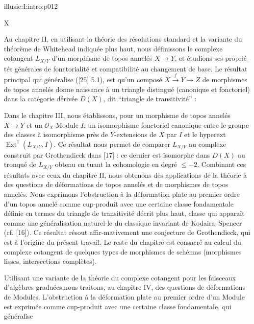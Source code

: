 \IllusieSetPhysicalPageSize{447bp}{698.6bp}
\begin{illusiefrontpage}{illusie:I:intro:p012}{}
\begin{center}\fontsize{10}{12}\selectfont X\end{center}
\vspace{12bp}
\hypertarget{illusie:I:intro:p012:p1}{}%
Au chapitre II, en utilisant la théorie des résolutions standard et la variante du
théorème de Whitehead indiquée plus haut, nous définissons le complexe cotangent
$L_{X/Y}$ d'un morphisme de topos annelés $X\longrightarrow Y$, et étudions ses
proprié-\linebreak tés générales de fonctorialité et compatibilité au changement de
base. Le résultat principal qui généralise ([25] 5.1), est qu'un composé
$X\xrightarrow{f}Y\longrightarrow Z$ de morphismes de topos annelés donne naissance
à un triangle distingué (canonique et fonctoriel) dans la catégorie dérivée $D(X)$,
dit ``triangle de transitivité'' :

\hypertarget{illusie:I:intro:p012:d1}{}%
\IllusieTransitivityTriangle

\vspace{1bp}
\hypertarget{illusie:I:intro:p012:p2}{}%
Dans le chapitre III, nous établissons, pour un morphisme de topos annelés
$X\longrightarrow Y$ et un $\mathcal O_X$-Module $I$, un isomorphisme fonctoriel
canonique entre le groupe des classes à isomorphisme près de $Y$-extensions de $X$
par $I$ et le hyperext $\operatorname{Ext}^{1}(L_{X/Y},I)$. Ce résultat nous permet
de comparer $L_{X/Y}$ au complexe construit par Grothendieck dans [17] : ce dernier
est isomorphe dans $D(X)$ au tronqué de $L_{X/Y}$ obtenu en tuant la cohomologie en
degré $\leq -2$. Combinant ces résultats avec ceux du chapitre II, nous obtenons des
applications de la théorie à des questions de déformations de topos annelés et de
morphismes de topos annelés. Nous exprimons l'obstruction à la déformation plate au
premier ordre d'un topos annelé comme cup-produit avec une certaine classe
fondamentale définie en termes du triangle de transitivité décrit plus haut, classe
qui apparaît comme une généralisation naturel-\linebreak le du classique invariant
de Kodaira--Spencer (cf. [16]). Ce résultat résout affir-\linebreak mativement une
conjecture de Grothendieck, qui est à l'origine du présent travail. Le reste du
chapitre est consacré au calcul du complexe cotangent de quelques types de
morphismes de schémas (morphismes lisses, intersections complètes).

\vspace{4bp}
\hypertarget{illusie:I:intro:p012:p3}{}%
Utilisant une variante de la théorie du complexe cotangent pour les faisceaux
d'algèbres graduées,nous traitons, au chapitre IV, des questions de déformations de
Modules. L'obstruction à la déformation plate au premier ordre d'un Module est
exprimée comme cup-produit avec une certaine classe fondamentale, qui généralise
\end{illusiefrontpage}
